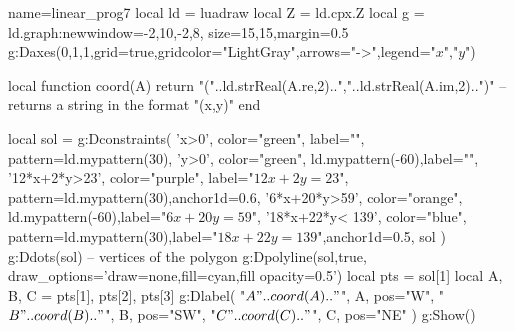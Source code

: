 \begin{luadraw}{name=linear_prog7}
local ld = luadraw
local Z = ld.cpx.Z
local g = ld.graph:new{window={-2,10,-2,8}, size={15,15},margin=0.5}
g:Daxes({0,1,1},{grid=true,gridcolor="LightGray",arrows="->",legend={"$x$","$y$"}})

local function coord(A)
    return "("..ld.strReal(A.re,2)..","..ld.strReal(A.im,2)..")" --returns a string in the format "(x,y)"
end

local sol = {}
g:Dconstraints(
'x>0', {color="green", label="", pattern=ld.mypattern(30)},
'y>0', {color="green", ld.mypattern(-60),label=""},
     '12*x+2*y>23', {color="purple", label="$12x+2y=23$", pattern=ld.mypattern(30),anchor1d=0.6},
 '6*x+20*y>59', {color="orange", ld.mypattern(-60),label="$6x+20y=59$"},
'18*x+22*y< 139', {color="blue", pattern=ld.mypattern(30),label="$18x+22y=139$",anchor1d=0.5},
    sol
    )
g:Ddots(sol) -- vertices of the polygon
g:Dpolyline(sol,true, {draw_options='draw=none,fill=cyan,fill opacity=0.5'})
local pts = sol[1] 
local A, B, C = pts[1], pts[2], pts[3]
g:Dlabel(
    "$A"..coord(A).."$", A, {pos="W"},
    "$B"..coord(B).."$", B, {pos="SW"},
    "$C"..coord(C).."$", C, {pos="NE"}
)
g:Show()
\end{luadraw}
